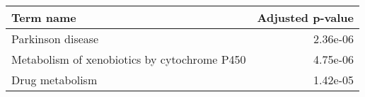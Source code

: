 \begin{tabular}{lr}
\toprule
                                   Term name &  Adjusted p-value \\
\midrule
                           Parkinson disease &          2.36e-06 \\
Metabolism of xenobiotics by cytochrome P450 &          4.75e-06 \\
                             Drug metabolism &          1.42e-05 \\
\bottomrule
\end{tabular}
